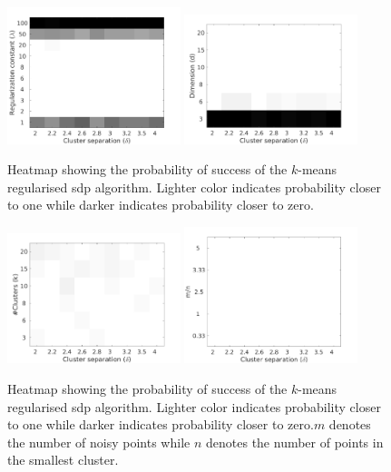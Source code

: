 \begin{figure}[t]
  \label{a-figure:simulation}
  \centering
  \includegraphics[width=0.45\textwidth]{figures/optimizationClustering/deltaLambda.png}
  \includegraphics[width=0.45\textwidth]{figures/optimizationClustering/deltaD.png}
  \caption{Heatmap showing the probability of success of the $k$-means regularised sdp algorithm. Lighter color indicates probability closer to one while darker indicates probability closer to zero.}
\end{figure}
\begin{figure}
  \includegraphics[width=0.45\textwidth]{figures/optimizationClustering/deltaK.png}
  \includegraphics[width=0.45\textwidth]{figures/optimizationClustering/deltaM.png}
  \caption{Heatmap showing the probability of success of the $k$-means regularised sdp algorithm. Lighter color indicates probability closer to one while darker indicates probability closer to zero.$m$ denotes the number of noisy points while $n$ denotes the number of points in the smallest cluster.}
\end{figure}
